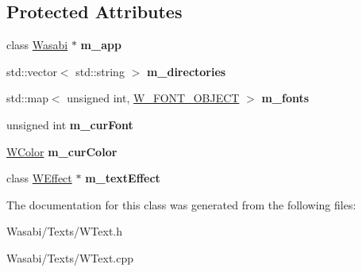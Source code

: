 \subsection*{Protected Attributes}
\begin{DoxyCompactItemize}
\item 
class \hyperlink{class_wasabi}{Wasabi} $\ast$ {\bfseries m\+\_\+app}\hypertarget{class_w_text_component_a89ad75cb63091bda1e5e5757955994e1}{}\label{class_w_text_component_a89ad75cb63091bda1e5e5757955994e1}

\item 
std\+::vector$<$ std\+::string $>$ {\bfseries m\+\_\+directories}\hypertarget{class_w_text_component_a9b7024448f1fcc35bfe3d972dbf74f30}{}\label{class_w_text_component_a9b7024448f1fcc35bfe3d972dbf74f30}

\item 
std\+::map$<$ unsigned int, \hyperlink{struct_w___f_o_n_t___o_b_j_e_c_t}{W\+\_\+\+F\+O\+N\+T\+\_\+\+O\+B\+J\+E\+CT} $>$ {\bfseries m\+\_\+fonts}\hypertarget{class_w_text_component_ab9be4ab20948d10cdbf798ba15e97b16}{}\label{class_w_text_component_ab9be4ab20948d10cdbf798ba15e97b16}

\item 
unsigned int {\bfseries m\+\_\+cur\+Font}\hypertarget{class_w_text_component_a6601148a11fdf9711071d05913e80c79}{}\label{class_w_text_component_a6601148a11fdf9711071d05913e80c79}

\item 
\hyperlink{class_w_color}{W\+Color} {\bfseries m\+\_\+cur\+Color}\hypertarget{class_w_text_component_a37b3634ddc5a1ba25bd3c676ba18b06d}{}\label{class_w_text_component_a37b3634ddc5a1ba25bd3c676ba18b06d}

\item 
class \hyperlink{class_w_effect}{W\+Effect} $\ast$ {\bfseries m\+\_\+text\+Effect}\hypertarget{class_w_text_component_a6eb0c9ac09a85b9dc05471180f62b1a0}{}\label{class_w_text_component_a6eb0c9ac09a85b9dc05471180f62b1a0}

\end{DoxyCompactItemize}


The documentation for this class was generated from the following files\+:\begin{DoxyCompactItemize}
\item 
Wasabi/\+Texts/W\+Text.\+h\item 
Wasabi/\+Texts/W\+Text.\+cpp\end{DoxyCompactItemize}
